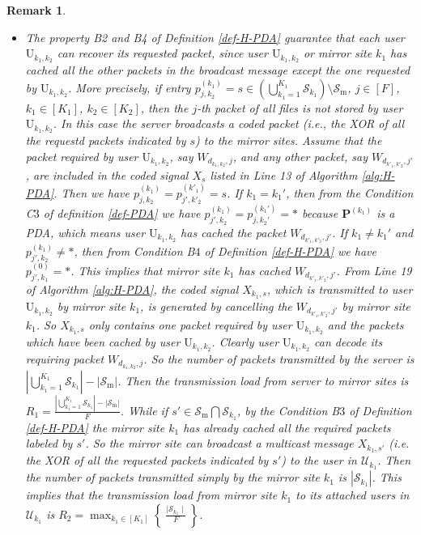 \documentclass[onecolumn,10pt]{IEEEtran}
\theoremstyle{mythm}
\newtheorem{remark}{Remark}
\begin{document}
\begin{remark}
\begin{itemize}
\item The property B2 and B4 of Definition \ref{def-H-PDA} guarantee that each user $\text{U}_{k_1,k_2}$ can recover its requested packet, since user $\text{U}_{k_1,k_2}$ or mirror site $k_1$ has cached all the other packets in the broadcast message except the one requested by $\text{U}_{k_1,k_2}$. More precisely, if entry $p^{(k_1)}_{j,k_2} =s\in\left(\bigcup_{k_1=1}^{K_1}\mathcal{S}_{k_1}\right)\setminus\mathcal{S}_\text{m}$, $j\in[F]$, $k_1\in[K_1]$, $k_2 \in [K_2]$, then the $j$-th packet of all files is not stored by user $\text{U}_{k_1,k_2}$. In this case the server broadcasts a coded packet (i.e., the XOR of all the requestd packets indicated by $s$) to the mirror sites. Assume that the packet required by user $\text{U}_{k_1,k_2}$, say $W_{d_{k_1,k_2},j}$, and any other packet, say $W_{d_{k'_1,k'_2},j'}$, are included in the coded signal $X_s$ listed in Line 13 of Algorithm \ref{alg:H-PDA}. Then we have $p^{(k_1)}_{j,k_2}=p^{(k'_1)}_{j',k'_2}=s$. If $k_1=k_1'$, then from the Condition C$3$ of definition \ref{def-PDA} we have $p^{(k_1)}_{j',k_2}=p^{(k_1')}_{j,k_2'}=*$ because $\mathbf{P}^{(k_1)}$ is a PDA, which means user $\text{U}_{k_1,k_2}$ has cached the packet $W_{d_{k'_1,k'_2},j'}$. If $k_1\neq k_1'$ and $p^{(k_1)}_{j',k_2}\neq *$, then from Condition B$4$ of Definition \ref{def-H-PDA} we have $p^{(0)}_{j',k_1}=*$. This implies that mirror site $k_1$ has cached $W_{d_{k'_1,k'_2},j'}$. From Line 19 of Algorithm \ref{alg:H-PDA}, the coded signal $X_{k_1,s}$, which is transmitted to user $\text{U}_{k_1,k_2}$ by mirror site $k_1$, is generated by cancelling the $W_{d_{k'_1,k'_2},j'}$ by mirror site $k_1$. So $X_{k_1,s}$ only contains one packet required by user $\text{U}_{k_1,k_2}$ and the packets which have been cached by user $\text{U}_{k_1,k_2}$. Clearly user $\text{U}_{k_1,k_2}$ can decode its requiring packet $W_{d_{k_1,k_2},j}$. So the number of packets transmitted by the server is $|\bigcup_{k_1=1}^{K_1}\mathcal{S}_{k_1}|-|\mathcal{S}_\text{m}|$. Then the transmission load from server to mirror sites is $R_1=\frac{|\bigcup_{k_1=1}^{K_1}\mathcal{S}_{k_1}|-|\mathcal{S}_\text{m}|}{F}$. While if $s'\in \mathcal{S}_\text{m}\bigcap\mathcal{S}_{k_1}$, by the Condition B$3$ of Definition \ref{def-H-PDA} the mirror site $k_1$ has already cached all the required packets labeled by $s'$. So the mirror site can broadcast a multicast message $X_{k_1,s'}$ (i.e. the XOR of all the requested packets indicated by $s'$) to the user in $\mathcal{U}_{k_1}$. Then the number of packets transmitted simply by the mirror site $k_1$ is $|\mathcal{S}_{k_1}|$. This implies that the transmission load from mirror site $k_1$ to its attached users in $\mathcal{U}_{k_1}$ is $R_2=\max_{k_1\in[K_1]}\left\{\  \frac{\mid\mathcal{S}_{k_1}\mid}{F}\ \right\}$.

\end{itemize}
\end{remark}
\end{document}
